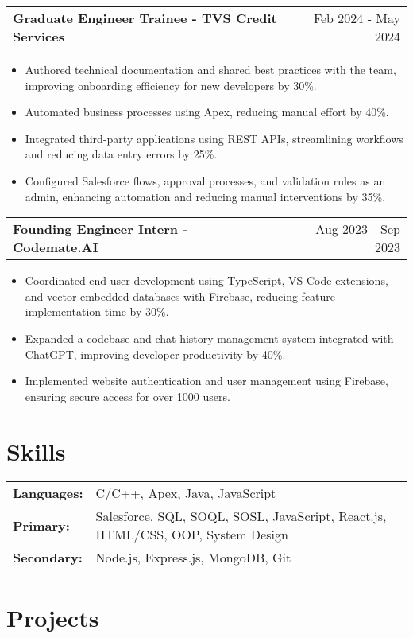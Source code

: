 \documentclass[a4paper,10pt]{article}
\makeatletter
\newenvironment{joblong}[2]
    {
    \begin{tabularx}{\linewidth}{@{}l X r@{}}
    \textbf{#1} & \hfill &  #2 \\[3.75pt]
    \end{tabularx}
    \begin{minipage}[t]{\linewidth}
    \begin{itemize}[nosep,after=\strut, leftmargin=1em, itemsep=3pt,label=--]
    }
    {
    \end{itemize}
    \end{minipage}    
    }
\makeatother
\begin{document}
\begin{joblong}{Graduate Engineer Trainee - TVS Credit Services}{Feb 2024 - May 2024} 
\item Authored technical documentation and shared best practices with the team, improving onboarding efficiency for new developers by 30\%.  
\item Automated business processes using Apex, reducing manual effort by 40\%.  
\item Integrated third-party applications using REST APIs, streamlining workflows and reducing data entry errors by 25\%.  
\item Configured Salesforce flows, approval processes, and validation rules as an admin, enhancing automation and reducing manual interventions by 35\%.  
\end{joblong}

\begin{joblong}{Founding Engineer Intern - Codemate.AI}{Aug 2023 - Sep 2023}
\item Coordinated end-user development using TypeScript, VS Code extensions, and vector-embedded databases with Firebase, reducing feature implementation time by 30\%.  
\item Expanded a codebase and chat history management system integrated with ChatGPT, improving developer productivity by 40\%.  
\item Implemented website authentication and user management using Firebase, ensuring secure access for over 1000 users.   
\end{joblong}

\section{Skills}
\begin{tabularx}{\linewidth}{@{}l X@{}}
\textbf{Languages:} &  \normalsize{C/C++, Apex, Java, JavaScript} \\
\textbf{Primary:}  &  \normalsize{Salesforce, SQL, SOQL, SOSL, JavaScript, React.js, HTML/CSS, OOP, System Design} \\  
\textbf{Secondary:}  &  \normalsize{Node.js, Express.js, MongoDB, Git} \\
\end{tabularx}

\section{Projects}
\end{document}
